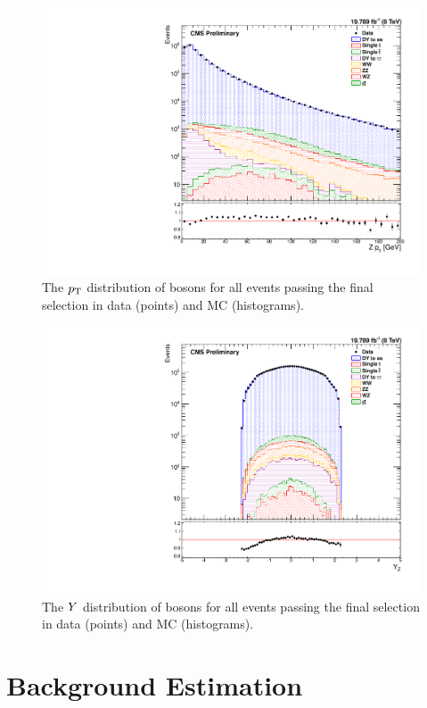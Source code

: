 \begin{figure}[tb]
    \centering
    \includegraphics[width=\textwidth]{figures/z_pt.pdf}
    \caption{
        The $p_{\mathrm{T}}$ distribution of \Z bosons for all events passing the final
        selection in data (points) and MC (histograms).
    }
    \label{fig:z_pt}
\end{figure}

\begin{figure}[tb]
    \centering
    \includegraphics[width=\textwidth]{figures/z_rapidity.pdf}
    \caption{
        The $Y$ distribution of \Z bosons for all events passing the
        final selection in data (points) and MC (histograms).
    }
    \label{fig:z_rapidity}
\end{figure}

\section{Background Estimation}

